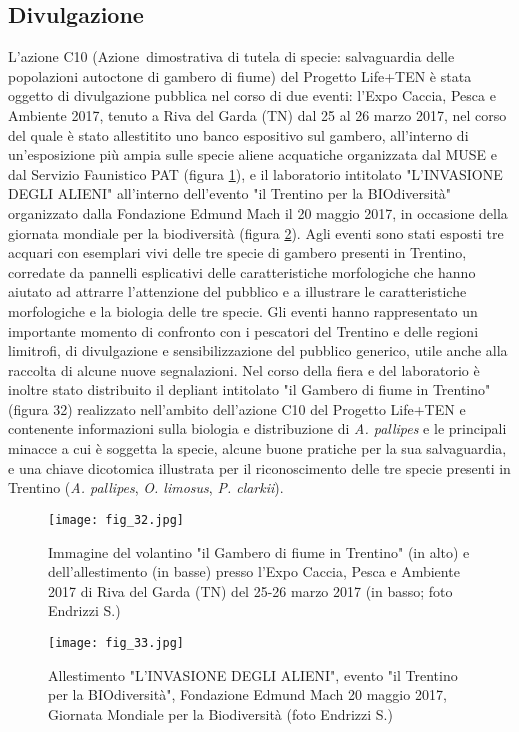\documentclass[11pt,a4paper,italian,twoside,openany]{memoir}
\begin{document}
\subsection{Divulgazione}
L'azione C10 (Azione dimostrativa di tutela di specie: salvaguardia delle popolazioni autoctone di gambero di fiume) del Progetto Life+TEN è stata oggetto di divulgazione pubblica nel corso di  due eventi: l'Expo Caccia, Pesca e Ambiente 2017, tenuto a Riva del Garda (TN) dal 25 al 26 marzo 2017, nel corso del quale è stato allestitito uno banco espositivo sul gambero, all'interno di un'esposizione più ampia sulle specie aliene acquatiche organizzata dal MUSE e dal Servizio Faunistico PAT (figura \ref{fig_32}), e il laboratorio intitolato "L'INVASIONE DEGLI ALIENI" all'interno dell'evento "il Trentino per la BIOdiversità" organizzato dalla Fondazione Edmund Mach il 20 maggio 2017, in occasione della giornata mondiale per la biodiversità (figura \ref{fig_33}). Agli eventi sono stati esposti tre acquari con esemplari vivi delle tre specie di gambero presenti in Trentino, corredate da pannelli esplicativi delle caratteristiche morfologiche che hanno aiutato ad attrarre l'attenzione del pubblico e a illustrare le caratteristiche morfologiche e la biologia delle tre specie. Gli eventi hanno rappresentato un importante momento di confronto con i pescatori del Trentino e delle regioni limitrofi, di divulgazione e sensibilizzazione del pubblico generico, utile anche alla raccolta di alcune nuove segnalazioni. Nel corso della fiera e del laboratorio è inoltre stato distribuito il depliant intitolato "il Gambero di fiume in Trentino" (figura 32) realizzato nell'ambito dell'azione C10 del Progetto Life+TEN e contenente informazioni sulla biologia e distribuzione di \emph{A. pallipes} e le principali minacce a cui è soggetta la specie, alcune buone pratiche per la sua salvaguardia, e una chiave dicotomica illustrata per il riconoscimento delle tre specie presenti in Trentino (\emph{A. pallipes}, \emph{O. limosus}, \emph{P. clarkii}).

\begin{figure}
  \centering
  \texttt{[image: fig\_32.jpg]}
  \caption{Immagine del volantino "il Gambero di fiume in Trentino" (in alto) e dell'allestimento (in basse) presso l'Expo Caccia, Pesca e Ambiente 2017 di Riva del Garda (TN) del 25-26 marzo 2017 (in basso; foto Endrizzi S.)}
  \label{fig_32}
\end{figure}

\begin{figure}
  \centering
  \texttt{[image: fig\_33.jpg]}
  \caption{Allestimento "L'INVASIONE DEGLI ALIENI", evento "il Trentino per la BIOdiversità", Fondazione Edmund Mach 20 maggio 2017, Giornata Mondiale per la Biodiversità (foto Endrizzi S.)}
  \label{fig_33}
\end{figure}
\end{document}

